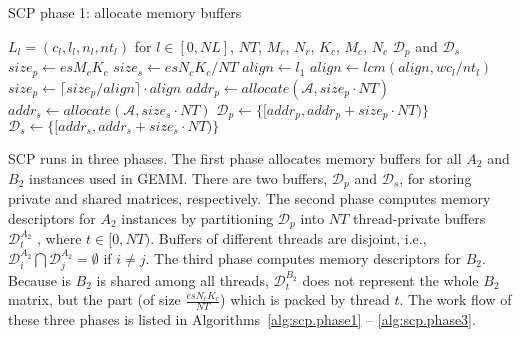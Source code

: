 \begin{algorithm}
  \caption{SCP phase 1: allocate memory buffers}
  \label{alg:scp.phase1}
  \begin{algorithmic}[1]
    \REQUIRE $L_l = (c_l,l_l,n_l,nt_l)$ for $l \in [0, NL]$, $NT$,
    $M_r$, $N_r$, $K_c$, $M_c$, $N_c$
    \ENSURE $\mathcal{D}_p$ and $\mathcal{D}_s$
    \STATE $size_p \gets es M_c K_c$ \label{line:size.p}
    \STATE $size_s \gets es N_c K_c / NT$ \label{line:size.s}
    \STATE $align \gets l_1$ \label{line:align.init}
     \label{line:align.for}
     \label{line:align.type}
    \STATE $align \gets lcm(align, wc_l / nt_l)$ \label{line:align.update}
    \ENDIF
    \ENDFOR \label{line:align.endfor}
    \STATE $size_p \gets \lceil size_p / align \rceil \cdot align$ \label{line:align}
    \STATE $addr_p \gets allocate(\mathcal{A}, size_p \cdot NT)$ \label{line:alloc.begin}
    \STATE $addr_s \gets allocate(\mathcal{A}, size_s \cdot NT)$ \label{line:alloc.end}
    \STATE $\mathcal{D}_p \gets \lbrace [addr_p, addr_p + size_p \cdot NT) \rbrace$ \label{line:d.begin}
    \STATE $\mathcal{D}_s \gets \lbrace [addr_s, addr_s + size_s \cdot NT) \rbrace$ \label{line:d.end}
  \end{algorithmic}
\end{algorithm}

SCP runs in three phases.
The first phase allocates memory buffers for all $A_2$ and $B_2$
instances used in GEMM. There are two buffers, $\mathcal{D}_p$ and $\mathcal{D}_s$,
for storing private and shared matrices, respectively.
The second phase computes memory descriptors for $A_2$ instances
by partitioning $\mathcal{D}_p$ into $NT$ thread-private buffers
$\mathcal{D}_t^{A_2}$ , where $t \in [0, NT)$.
Buffers of different threads are disjoint,
i.e., $\mathcal{D}_i^{A_2} \bigcap \mathcal{D}_j^{A_2} = \emptyset$ if $i \ne j$.
The third phase computes memory descriptors for $B_2$.
Because is $B_2$ is shared among all threads,
$\mathcal{D}_t^{B_2}$ does not represent the whole $B_2$ matrix,
but the part (of size $\frac{es N_c K_c}{NT}$) which is packed by thread $t$.
The work flow of these three phases is listed
in Algorithms~\ref{alg:scp.phase1} -- \ref{alg:scp.phase3}.

